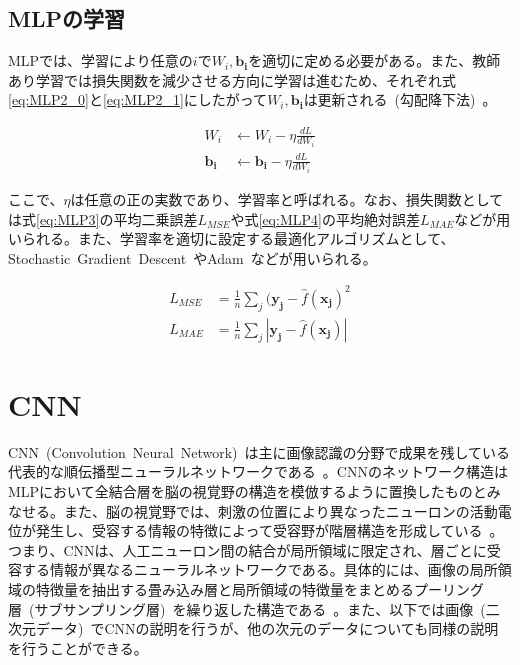\subsection{MLPの学習}


MLPでは、学習により任意の$i$で$W_i,\boldsymbol{b_i}$を適切に定める必要がある。また、教師あり学習では損失関数を減少させる方向に学習は進むため、それぞれ式\ref{eq:MLP2_0}と\ref{eq:MLP2_1}にしたがって$W_i,\boldsymbol{b_i}$は更新される~(勾配降下法)~。

\begin{align}
    \label{eq:MLP2_0}
    W _i &\leftarrow W_i - \eta \frac{d L}{dW_i} \\
    \label{eq:MLP2_1}
    \boldsymbol{b _i} &\leftarrow \boldsymbol{b_i} - \eta \frac{d L}{dW_i}
\end{align}

ここで、$\eta$は任意の正の実数であり、学習率と呼ばれる。なお、損失関数としては式\ref{eq:MLP3}の平均二乗誤差$L_{MSE}$や式\ref{eq:MLP4}の平均絶対誤差$L_{MAE}$などが用いられる。また、学習率を適切に設定する最適化アルゴリズムとして、Stochastic~Gradient~Descent~\cite{SGD}やAdam~\cite{Adam}などが用いられる。

\begin{align}
    \label{eq:MLP3}
    L_{MSE}&=\frac{1}{n}\sum _{j} {(\boldsymbol{y_j} - \hat{f}(\boldsymbol{x_j})^2}\\
    \label{eq:MLP4}
    L_{MAE}&=\frac{1}{n}\sum _{j} {|\boldsymbol{y_j} - \hat{f}(\boldsymbol{x_j})|}
\end{align}

\section{CNN}


CNN~(Convolution~Neural~Network)~は主に画像認識の分野で成果を残している代表的な順伝播型ニューラルネットワークである~\cite{AlexNet}。CNNのネットワーク構造はMLPにおいて全結合層を脳の視覚野の構造を模倣するように置換したものとみなせる。また、脳の視覚野では、刺激の位置により異なったニューロンの活動電位が発生し、受容する情報の特徴によって受容野が階層構造を形成している~\cite{neocognition}。つまり、CNNは、人工ニューロン間の結合が局所領域に限定され、層ごとに受容する情報が異なるニューラルネットワークである。具体的には、画像の局所領域の特徴量を抽出する畳み込み層と局所領域の特徴量をまとめるプーリング層~(サブサンプリング層)~を繰り返した構造である~\cite{CNNsurvey}。また、以下では画像~(二次元データ)~でCNNの説明を行うが、他の次元のデータについても同様の説明を行うことができる。

